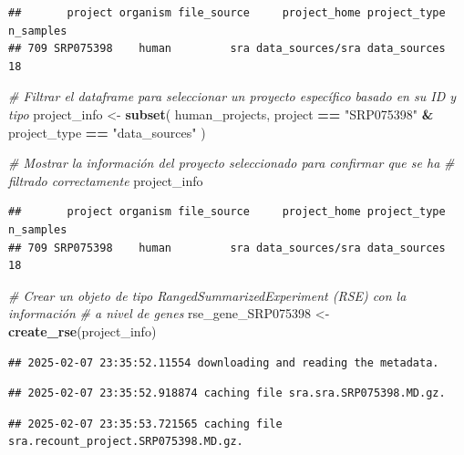 \documentclass[
]{article}
\newenvironment{Shaded}{\begin{snugshade}}{\end{snugshade}}
\newcommand{\CommentTok}[1]{\textcolor[rgb]{0.56,0.35,0.01}{\textit{#1}}}
\newcommand{\FunctionTok}[1]{\textcolor[rgb]{0.13,0.29,0.53}{\textbf{#1}}}
\newcommand{\NormalTok}[1]{#1}
\newcommand{\OtherTok}[1]{\textcolor[rgb]{0.56,0.35,0.01}{#1}}
\newcommand{\SpecialCharTok}[1]{\textcolor[rgb]{0.81,0.36,0.00}{\textbf{#1}}}
\newcommand{\StringTok}[1]{\textcolor[rgb]{0.31,0.60,0.02}{#1}}
\begin{document}
\begin{verbatim}
##       project organism file_source     project_home project_type n_samples
## 709 SRP075398    human         sra data_sources/sra data_sources        18
\end{verbatim}

\begin{Shaded}
\begin{Highlighting}[]
\CommentTok{\# Filtrar el dataframe para seleccionar un proyecto específico basado en su ID y tipo}
\NormalTok{project\_info }\OtherTok{\textless{}{-}} \FunctionTok{subset}\NormalTok{(}
\NormalTok{  human\_projects,}
\NormalTok{  project }\SpecialCharTok{==} \StringTok{"SRP075398"} \SpecialCharTok{\&}\NormalTok{ project\_type }\SpecialCharTok{==} \StringTok{"data\_sources"}
\NormalTok{)}

\CommentTok{\# Mostrar la información del proyecto seleccionado para confirmar que se ha}
\CommentTok{\# filtrado correctamente}
\NormalTok{project\_info}
\end{Highlighting}
\end{Shaded}

\begin{verbatim}
##       project organism file_source     project_home project_type n_samples
## 709 SRP075398    human         sra data_sources/sra data_sources        18
\end{verbatim}

\begin{Shaded}
\begin{Highlighting}[]
\CommentTok{\# Crear un objeto de tipo RangedSummarizedExperiment (RSE) con la información}
\CommentTok{\# a nivel de genes}
\NormalTok{rse\_gene\_SRP075398 }\OtherTok{\textless{}{-}} \FunctionTok{create\_rse}\NormalTok{(project\_info)}
\end{Highlighting}
\end{Shaded}

\begin{verbatim}
## 2025-02-07 23:35:52.11554 downloading and reading the metadata.
\end{verbatim}

\begin{verbatim}
## 2025-02-07 23:35:52.918874 caching file sra.sra.SRP075398.MD.gz.
\end{verbatim}

\begin{verbatim}
## 2025-02-07 23:35:53.721565 caching file sra.recount_project.SRP075398.MD.gz.
\end{verbatim}
\end{document}

